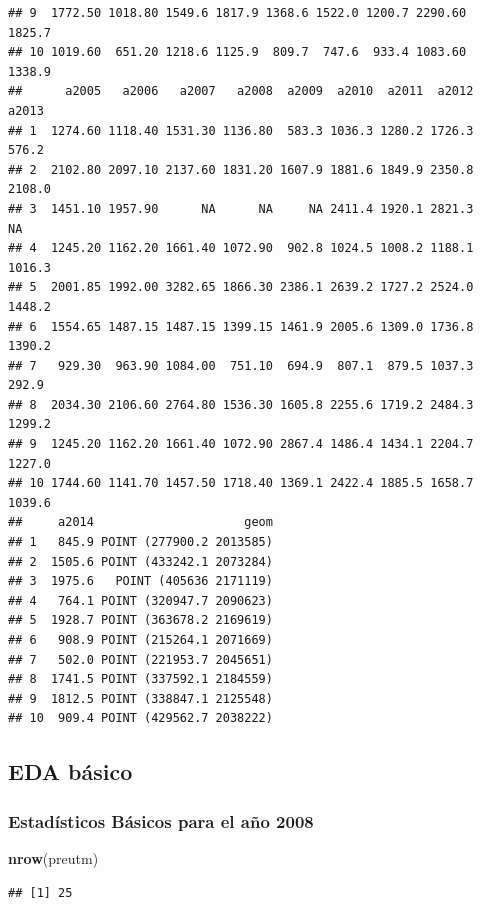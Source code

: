 \documentclass[11pt,]{article}
\newenvironment{Shaded}{\begin{snugshade}}{\end{snugshade}}
\newcommand{\KeywordTok}[1]{\textcolor[rgb]{0.13,0.29,0.53}{\textbf{#1}}}
\newcommand{\OperatorTok}[1]{\textcolor[rgb]{0.81,0.36,0.00}{\textbf{#1}}}
\newcommand{\NormalTok}[1]{#1}
\begin{document}
\begin{verbatim}
## 9  1772.50 1018.80 1549.6 1817.9 1368.6 1522.0 1200.7 2290.60 1825.7
## 10 1019.60  651.20 1218.6 1125.9  809.7  747.6  933.4 1083.60 1338.9
##      a2005   a2006   a2007   a2008  a2009  a2010  a2011  a2012  a2013
## 1  1274.60 1118.40 1531.30 1136.80  583.3 1036.3 1280.2 1726.3  576.2
## 2  2102.80 2097.10 2137.60 1831.20 1607.9 1881.6 1849.9 2350.8 2108.0
## 3  1451.10 1957.90      NA      NA     NA 2411.4 1920.1 2821.3     NA
## 4  1245.20 1162.20 1661.40 1072.90  902.8 1024.5 1008.2 1188.1 1016.3
## 5  2001.85 1992.00 3282.65 1866.30 2386.1 2639.2 1727.2 2524.0 1448.2
## 6  1554.65 1487.15 1487.15 1399.15 1461.9 2005.6 1309.0 1736.8 1390.2
## 7   929.30  963.90 1084.00  751.10  694.9  807.1  879.5 1037.3  292.9
## 8  2034.30 2106.60 2764.80 1536.30 1605.8 2255.6 1719.2 2484.3 1299.2
## 9  1245.20 1162.20 1661.40 1072.90 2867.4 1486.4 1434.1 2204.7 1227.0
## 10 1744.60 1141.70 1457.50 1718.40 1369.1 2422.4 1885.5 1658.7 1039.6
##     a2014                     geom
## 1   845.9 POINT (277900.2 2013585)
## 2  1505.6 POINT (433242.1 2073284)
## 3  1975.6   POINT (405636 2171119)
## 4   764.1 POINT (320947.7 2090623)
## 5  1928.7 POINT (363678.2 2169619)
## 6   908.9 POINT (215264.1 2071669)
## 7   502.0 POINT (221953.7 2045651)
## 8  1741.5 POINT (337592.1 2184559)
## 9  1812.5 POINT (338847.1 2125548)
## 10  909.4 POINT (429562.7 2038222)
\end{verbatim}

\subsection{EDA básico}\label{eda-buxe1sico-1}

\subsubsection{Estadísticos Básicos para el año
2008}\label{estaduxedsticos-buxe1sicos-para-el-auxf1o-2008-1}

\begin{Shaded}
\begin{Highlighting}[]
\KeywordTok{nrow}\NormalTok{(preutm)}
\end{Highlighting}
\end{Shaded}

\begin{verbatim}
## [1] 25
\end{verbatim}

\begin{Shaded}
\end{Shaded}
\end{document}
